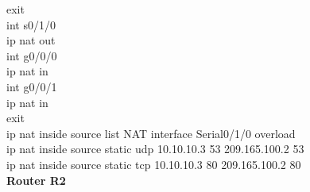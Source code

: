 \documentclass[a4paper, 12pt]{article}
\begin{document}
{\hspace*{2cm}exit\\
\hspace*{2cm}int s0/1/0\\
\hspace*{2cm}ip nat out\\
\hspace*{2cm}int g0/0/0\\
\hspace*{2cm}ip nat in\\
\hspace*{2cm}int g0/0/1\\
\hspace*{2cm}ip nat in\\
\hspace*{2cm}exit\\
\hspace*{2cm}ip nat inside source list NAT interface Serial0/1/0 overload\\
\hspace*{2cm}ip nat inside source static udp 10.10.10.3 53 209.165.100.2 53 \\
\hspace*{2cm}ip nat inside source static tcp 10.10.10.3 80 209.165.100.2 80\\}
\hspace*{1cm}\textbf{Router R2}	\\
\end{document}
